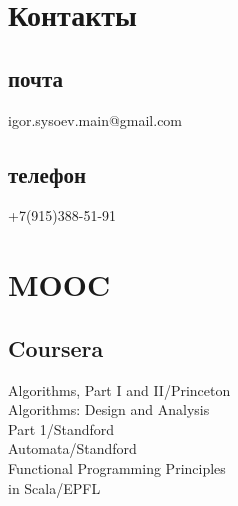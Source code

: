 \documentclass[a4paper]{curricula-vitae}
\begin{document}




\begin{minipage}[t]{0.33\textwidth} %

\section{Контакты} 

\subsection{почта}
igor.sysoev.main@gmail.com

\insertspace

\subsection{телефон}
+7(915)388-51-91

\insertspace

\section{MOOC}

\subsection{Coursera}
Algorithms, Part I and II/Princeton \\
Algorithms: Design and Analysis \\
Part 1/Standford \\
Automata/Standford \\
Functional Programming Principles \\
in Scala/EPFL

\insertspace


\end{minipage}
\end{document}
